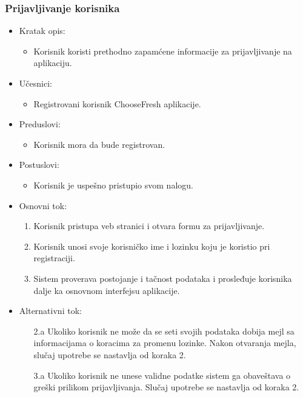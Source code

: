 \subsubsection{Prijavljivanje korisnika}

\begin{itemize}
    \item Kratak opis:
        \begin{itemize}
            \item Korisnik koristi prethodno zapamćene informacije za prijavljivanje na aplikaciju.
        \end{itemize}
    \item Učesnici:
        \begin{itemize}
            \item Registrovani korisnik ChooseFresh aplikacije.
        \end{itemize}
    \item Preduslovi:
        \begin{itemize}
            \item Korisnik mora da bude registrovan.
        \end{itemize}
    \item Postuslovi:
        \begin{itemize}
            \item Korisnik je uspešno pristupio svom nalogu.
        \end{itemize}
    \item Osnovni tok:
        \begin{enumerate}
            \item Korisnik pristupa veb stranici i otvara formu za prijavljivanje.
            \item Korisnik unosi svoje korisničko ime i lozinku koju je koristio pri registraciji.
            \item Sistem proverava postojanje i tačnost podataka i prosleđuje korisnika dalje ka osnovnom interfejsu aplikacije.
        \end{enumerate}
    \item Alternativni tok:
        \begin{itemize}
            \item[2.a] Ukoliko korisnik ne može da se seti svojih podataka dobija mejl sa informacijama o koracima za promenu lozinke. Nakon otvaranja mejla, slučaj upotrebe se nastavlja od koraka 2.
			\item[3.a] Ukoliko korisnik ne unese validne podatke sistem ga obaveštava o greški prilikom prijavljivanja. Slučaj upotrebe se nastavlja od koraka 2.

\end{itemize}
\end{itemize}
